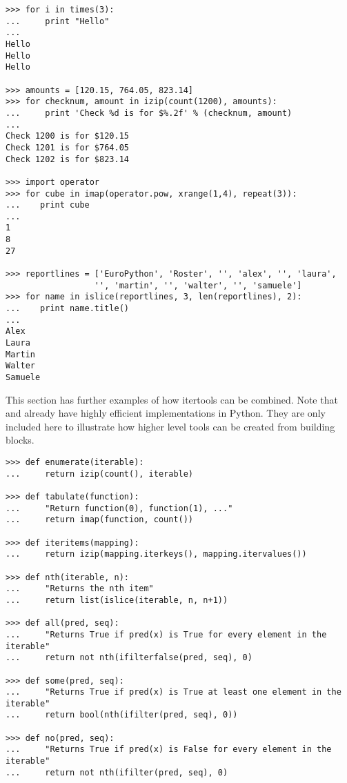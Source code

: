 \begin{verbatim}
>>> for i in times(3):
...     print "Hello"
...
Hello
Hello
Hello

>>> amounts = [120.15, 764.05, 823.14]
>>> for checknum, amount in izip(count(1200), amounts):
...     print 'Check %d is for $%.2f' % (checknum, amount)
...
Check 1200 is for $120.15
Check 1201 is for $764.05
Check 1202 is for $823.14

>>> import operator
>>> for cube in imap(operator.pow, xrange(1,4), repeat(3)):
...    print cube
...
1
8
27

>>> reportlines = ['EuroPython', 'Roster', '', 'alex', '', 'laura',
                  '', 'martin', '', 'walter', '', 'samuele']
>>> for name in islice(reportlines, 3, len(reportlines), 2):
...    print name.title()
...
Alex
Laura
Martin
Walter
Samuele

\end{verbatim}

This section has further examples of how itertools can be combined.
Note that  and  already
have highly efficient implementations in Python.  They are only
included here to illustrate how higher level tools can be created
from building blocks.

\begin{verbatim}
>>> def enumerate(iterable):
...     return izip(count(), iterable)

>>> def tabulate(function):
...     "Return function(0), function(1), ..."
...     return imap(function, count())

>>> def iteritems(mapping):
...     return izip(mapping.iterkeys(), mapping.itervalues())

>>> def nth(iterable, n):
...     "Returns the nth item"
...     return list(islice(iterable, n, n+1))

>>> def all(pred, seq):
...     "Returns True if pred(x) is True for every element in the iterable"
...     return not nth(ifilterfalse(pred, seq), 0)

>>> def some(pred, seq):
...     "Returns True if pred(x) is True at least one element in the iterable"
...     return bool(nth(ifilter(pred, seq), 0))

>>> def no(pred, seq):
...     "Returns True if pred(x) is False for every element in the iterable"
...     return not nth(ifilter(pred, seq), 0)

\end{verbatim}
